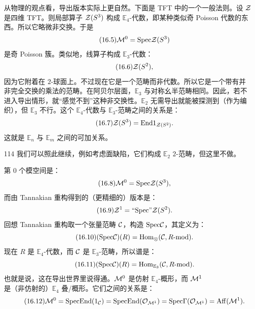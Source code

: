 从物理的观点看，导出版本实际上更自然。下面是 TFT 中的一个一般法则。设 $\mathcal{Z}$ 是四维 TFT。则局部算子 $\mathcal{Z}(S^3)$ 构成 $\mathbb{E}_4$-代数，即某种类似奇 Poisson 代数的东西。所以它略微非交换。于是
\begin{equation}\tag{16.5}
\mathcal{M}^0=\mathrm{Spec}\mathcal{Z}(S^3)
\end{equation}
是奇 Poisson 簇。类似地，线算子构成 $\mathbb{E}_3$-代数：
\begin{equation}\tag{16.6}
\mathcal{Z}(S^2),
\end{equation}
因为它附着在 $2$-球面上。不过现在它是一个范畴而非代数。所以它是一个带有并非完全交换的乘法的范畴。在阿贝尔层面，$\mathbb{E}_3$ 与对称幺半范畴相同。因此，若不进入导出情形，就“感觉不到”这种非交换性。$\mathbb{E}_2$ 无需导出就能被探测到（作为编织），但 $\mathbb{E}_3$ 不行。这个 $\mathbb{E}_4$-代数与 $\mathbb{E}_3$-范畴之间的关系是：
\begin{equation}\tag{16.7}
\mathcal{Z}(S^3)=\mathrm{End} 1_{\mathcal{Z}(S^2)}.
\end{equation}
这就是 $\mathbb{E}_n$ 与 $\mathbb{E}_m$ 之间的可加关系。%

\begin{srcrem}{114}
我们可以照此继续，例如考虑面缺陷，它们构成 $\mathbb{E}_2$ $2$-范畴，但这里不做。
\end{srcrem}

第 $0$ 个模空间是：
\begin{equation}\tag{16.8}
\mathcal{M}^0=\mathrm{Spec}\mathcal{Z}(S^3),
\end{equation}
而由 Tannakian 重构得到的（更精细的）版本是：
\begin{equation}\tag{16.9}
\mathcal{Z}^1=\text{“}\mathrm{Spec}\text{”}\mathcal{Z}(S^2).
\end{equation}
回想 Tannakian 重构取一个张量范畴 $\mathcal{C}$，构造 $\mathrm{Spec}\mathcal{C}$，其定义为：
\begin{equation}\tag{16.10}
(\mathrm{Spec}\mathcal{C})(R)=\mathrm{Hom}_{\otimes}(\mathcal{C},R\text{-}\mathrm{mod}).
\end{equation}
现在 $R$ 是 $\mathbb{E}_4$-代数，而 $\mathcal{C}$ 是 $\mathbb{E}_3$-范畴，所以谱是：
\begin{equation}\tag{16.11}
(\mathrm{Spec}\mathcal{C})(R)=\mathrm{Hom}_{\mathbb{E}_3}(\mathcal{C},R\text{-}\mathrm{mod}).
\end{equation}
也就是说，这在导出世界里说得通。$\mathcal{M}^0$ 是仿射 $\mathbb{E}_4$-概形，而 $\mathcal{M}^1$ 是（非仿射的）$\mathbb{E}_4$ 叠/概形。它们之间的关系是：
\begin{equation}\tag{16.12}
\mathcal{M}^0=\mathrm{Spec}\mathrm{End}(1_{\mathcal{C}})=\mathrm{Spec}\mathrm{End}(\mathcal{O}_{\mathcal{M}^1})=\mathrm{Spec}\Gamma(\mathcal{O}_{\mathcal{M}^1})=\mathrm{Aff}(\mathcal{M}^1).
\end{equation}

